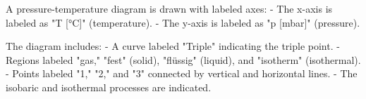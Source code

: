 A pressure-temperature diagram is drawn with labeled axes:  
- The x-axis is labeled as "T [°C]" (temperature).  
- The y-axis is labeled as "p [mbar]" (pressure).  

The diagram includes:  
- A curve labeled "Triple" indicating the triple point.  
- Regions labeled "gas," "fest" (solid), "flüssig" (liquid), and "isotherm" (isothermal).  
- Points labeled "1," "2," and "3" connected by vertical and horizontal lines.  
- The isobaric and isothermal processes are indicated.